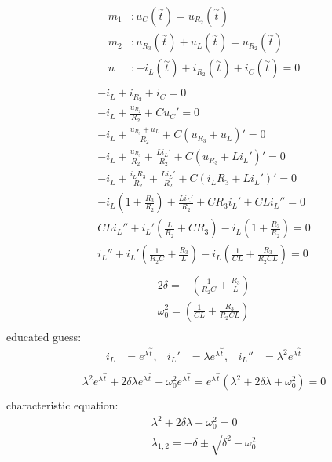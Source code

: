 \documentclass[a4paper]{article}
\begin{document}
\begin{align*}
	m_1&: u_C(\overset{\sim }{t}) = u_{R_2}(\overset{\sim }{t})\\
	m_2&: u_{R_3}(\overset{\sim }{t}) + u_L(\overset{\sim }{t}) = u_{R_2}(\overset{\sim }{t})\\
	n&: -i_L(\overset{\sim }{t}) + i_{R_2}(\overset{\sim }{t}) + i_C(\overset{\sim }{t}) = 0\\
\end{align*}
\begin{align*}
	-i_L + i_{R_2} + i_C = 0\\
	-i_L + \frac{u_{R_2}}{R_2} + Cu_C' = 0\\
	-i_L + \frac{u_{R_3} + u_L}{R_2} + C(u_{R_3} + u_L)' = 0\\
	-i_L + \frac{u_{R_3}}{R_2} + \frac{Li_L'}{R_2} + C(u_{R_3} + Li_L')' = 0\\
	-i_L + \frac{i_LR_3}{R_2} + \frac{Li_L'}{R_2} + C(i_LR_3 + Li_L')' = 0\\
	-i_L \left(1 + \frac{R_3}{R_2} \right) + \frac{Li_L'}{R_2} + CR_3i_L' + CLi_L'' = 0\\
	CLi_L'' + i_L'\left( \frac{L}{R_2} + CR_3 \right) - i_L \left(1 + \frac{R_3}{R_2} \right) = 0\\
	i_L'' + i_L'\left( \frac{1}{R_2C} + \frac{R_3}{L} \right) - i_L \left(\frac{1}{CL} + \frac{R_3}{R_2CL} \right) = 0\\
\end{align*}
\begin{align*}
	2\delta = -\left( \frac{1}{R_2C} + \frac{R_3}{L} \right)\\
	\omega_0^2 = \left(\frac{1}{CL} + \frac{R_3}{R_2CL} \right)\\
\end{align*}
educated guess:
\begin{align*}
	i_L &= e^{\lambda \overset{\sim }{t}},&
	i_L' &= \lambda e^{\lambda \overset{\sim }{t}},&
	i_L'' &= \lambda^2 e^{\lambda \overset{\sim }{t}}\\
\end{align*}
\begin{align*}
	\lambda^2 e^{\lambda \overset{\sim }{t}} + 2\delta\lambda e^{\lambda \overset{\sim }{t}} + \omega_0^2 e^{\lambda \overset{\sim }{t}} 
	= e^{\lambda \overset{\sim }{t}}(\lambda^2 + 2\delta\lambda + \omega_0^2) = 0\\
\end{align*}
characteristic equation:
\begin{align*}
	\lambda^2 + 2\delta\lambda + \omega_0^2 = 0\\
	\lambda_{1,2} = -\delta \pm \sqrt{\delta^2 - \omega_0^2}\\
\end{align*}
\end{document}
